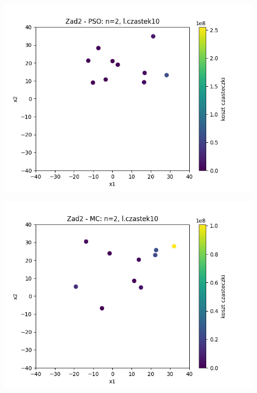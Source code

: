 \documentclass[11pt, a4paper, oneside]{article}
\begin{document}
\begin{figure}[h]
\centering
\begin{minipage}[b]{\dimexpr.5\textwidth-1em}
  \centering
  \includegraphics[width=1\linewidth]{grafiki/Wykresy2d/PSO_Zad2_startPositions.png}
  \label{fig:pozycjeStartowe:PSO2}
\end{minipage} \hfill
\begin{minipage}[b]{\dimexpr.5\textwidth-1em}
  \centering
  \includegraphics[width=1\linewidth]{grafiki/Wykresy2d/MC_Zad2_startPositions.png}
  \label{fig:pozycjeStartowe:MC2}
\end{minipage}
\end{figure}
\end{document}
